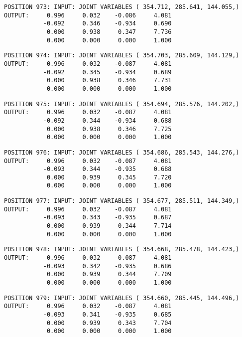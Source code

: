 \begin{verbatim}
POSITION 973: INPUT: JOINT VARIABLES ( 354.712, 285.641, 144.055,)
OUTPUT:     0.996     0.032    -0.086     4.081
           -0.092     0.346    -0.934     0.690
            0.000     0.938     0.347     7.736
            0.000     0.000     0.000     1.000
\end{verbatim} \pagebreak[1]\begin{verbatim}
POSITION 974: INPUT: JOINT VARIABLES ( 354.703, 285.609, 144.129,)
OUTPUT:     0.996     0.032    -0.087     4.081
           -0.092     0.345    -0.934     0.689
            0.000     0.938     0.346     7.731
            0.000     0.000     0.000     1.000
\end{verbatim} \pagebreak[1]\begin{verbatim}
POSITION 975: INPUT: JOINT VARIABLES ( 354.694, 285.576, 144.202,)
OUTPUT:     0.996     0.032    -0.087     4.081
           -0.092     0.344    -0.934     0.688
            0.000     0.938     0.346     7.725
            0.000     0.000     0.000     1.000
\end{verbatim} \pagebreak[1]\begin{verbatim}
POSITION 976: INPUT: JOINT VARIABLES ( 354.686, 285.543, 144.276,)
OUTPUT:     0.996     0.032    -0.087     4.081
           -0.093     0.344    -0.935     0.688
            0.000     0.939     0.345     7.720
            0.000     0.000     0.000     1.000
\end{verbatim} \pagebreak[1]\begin{verbatim}
POSITION 977: INPUT: JOINT VARIABLES ( 354.677, 285.511, 144.349,)
OUTPUT:     0.996     0.032    -0.087     4.081
           -0.093     0.343    -0.935     0.687
            0.000     0.939     0.344     7.714
            0.000     0.000     0.000     1.000
\end{verbatim} \pagebreak[1]\begin{verbatim}
POSITION 978: INPUT: JOINT VARIABLES ( 354.668, 285.478, 144.423,)
OUTPUT:     0.996     0.032    -0.087     4.081
           -0.093     0.342    -0.935     0.686
            0.000     0.939     0.344     7.709
            0.000     0.000     0.000     1.000
\end{verbatim} \pagebreak[1]\begin{verbatim}
POSITION 979: INPUT: JOINT VARIABLES ( 354.660, 285.445, 144.496,)
OUTPUT:     0.996     0.032    -0.087     4.081
           -0.093     0.341    -0.935     0.685
            0.000     0.939     0.343     7.704
            0.000     0.000     0.000     1.000
\end{verbatim} \pagebreak[1]\begin{verbatim}

\end{verbatim}
